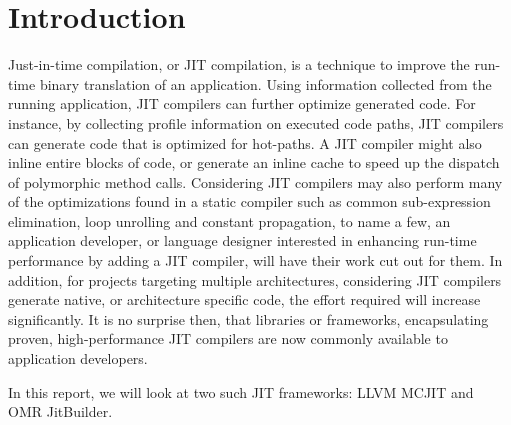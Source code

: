\section{Introduction}
Just-in-time compilation, or JIT compilation, is a technique to improve the run-time binary translation of an application.
Using information collected from the running application, JIT compilers can further optimize generated code.
For instance, by collecting profile information on executed code paths, JIT compilers can generate code that is optimized for hot-paths.
A JIT compiler might also inline entire blocks of code, or generate an inline cache to speed up the dispatch of polymorphic method calls.
Considering JIT compilers may also perform many of the optimizations found in a static compiler such as common sub-expression elimination, loop unrolling and constant propagation, to name a few, an application developer, or language designer interested in enhancing run-time performance by adding a JIT compiler, will have their work cut out for them.
In addition, for projects targeting multiple architectures, considering JIT compilers generate native, or architecture specific code, the effort required will increase significantly.
It is no surprise then, that libraries or frameworks, encapsulating proven, high-performance JIT compilers are now commonly available to application developers.

In this report, we will look at two such JIT frameworks: LLVM MCJIT and OMR JitBuilder.







